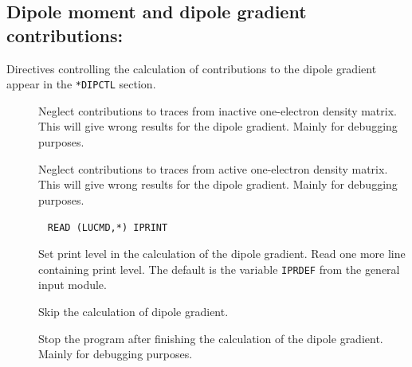 \subsection{Dipole moment and dipole gradient contributions:
}\label{sec:dipctl} 

Directives controlling the calculation of contributions to the
dipole gradient appear in the \verb|*DIPCTL| section.

\begin{description}
\item[] Neglect contributions to traces from
inactive one-electron density matrix. This will give wrong results for
the dipole gradient. Mainly for debugging purposes.

\item[] Neglect contributions to traces from
active one-electron density matrix. This will give wrong results for the
dipole gradient. Mainly for debugging purposes.

\item[]\verb| |\newline
\verb|READ (LUCMD,*) IPRINT|

Set print level in the calculation of the dipole gradient.  Read one more
line containing print level. The default 
is the variable \verb|IPRDEF| from the general input module.

\item[] Skip the calculation of dipole gradient.


\item[] Stop the program after finishing the calculation
of the dipole gradient. Mainly for debugging purposes.
\end{description}

%

